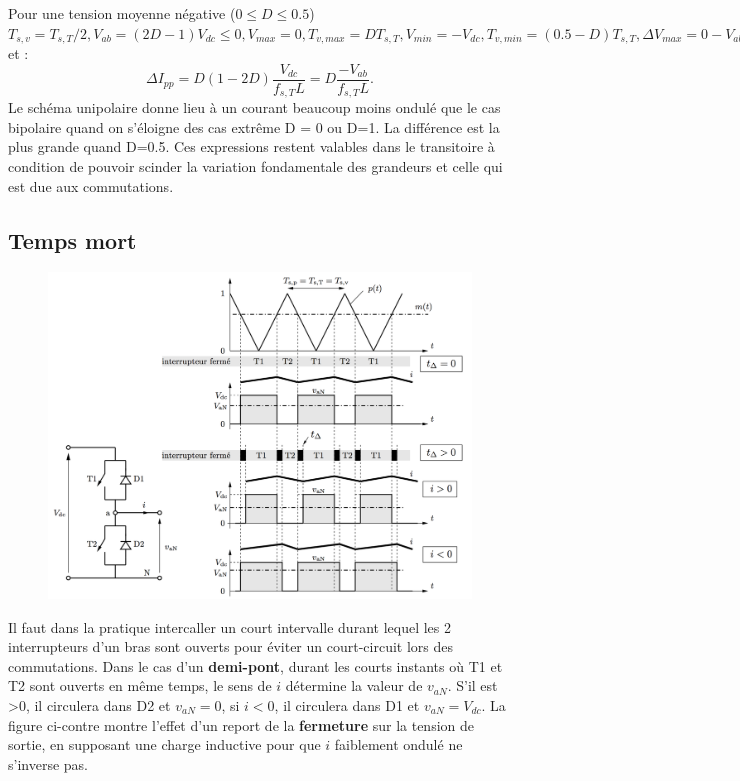 		Pour une tension moyenne négative ($0\leq D\leq 0.5$) $T_{s,v} = T_{s,T}/2, V_{ab} =(2D-1)V_{dc}\leq 0, V_{max}=0, T_{v,max}=DT_{s,T}, V_{min}=-V_{dc}, T_{v,min}= (0.5-D)T_{s,T}, \Delta V_{max}= 0-V_{ab}=(1-2D)V_{dc}$ et :
		\begin{equation}
			\Delta I_{pp} = D(1-2D)\frac{V_{dc}}{f_{s,T}L} = D\frac{-V_{ab}}{f_{s,T}L}.
		\end{equation}
		Le schéma unipolaire donne lieu à un courant beaucoup moins ondulé que le cas bipolaire quand on s'éloigne des cas extrême D = 0 ou D=1. La différence est la plus grande quand D=0.5. Ces expressions restent valables dans le transitoire à condition de pouvoir scinder la variation fondamentale des grandeurs et celle qui est due aux commutations.
		
	\subsection{Temps mort}
		\begin{figure}
		\vspace{-5mm}
		\includegraphics[scale=0.2]{ch4/15}
		\end{figure}
		Il faut dans la pratique intercaller un court intervalle durant lequel les 2 interrupteurs d'un bras sont ouverts pour éviter un court-circuit lors des commutations. Dans le cas d'un \textbf{demi-pont}, durant les courts instants où T1 et T2 sont ouverts en même temps, le sens de $i$ détermine la valeur de $v_{aN}$. S'il est >0, il circulera dans D2 et $v_{aN} =0$, si $i<0$, il circulera dans D1 et $v_{aN} = V_{dc}$. La figure ci-contre montre l'effet d'un report de la \textbf{fermeture} sur la tension de sortie, en supposant une charge inductive pour que $i$ faiblement ondulé ne s'inverse pas. 
		
